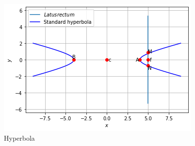\begin{figure}[!ht]
    \centering
    \includegraphics[width=\columnwidth]{solutions/su2021/2/38/a/hyperbola.png}
    \caption{Hyperbola}
    \label{quadform/38/a/fig:hyperbola}
\end{figure}  

